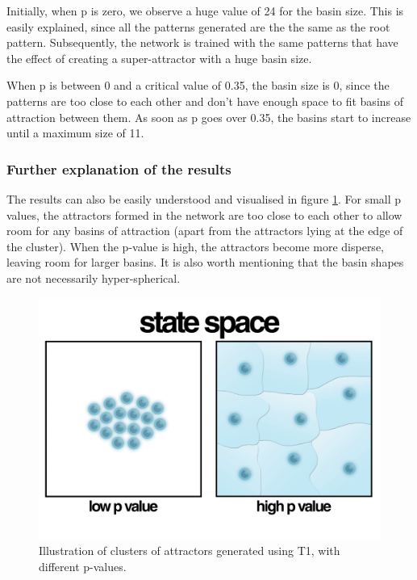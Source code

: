 Initially, when p is zero, we observe a huge value of 24 for the basin size. This is easily explained, since all the patterns generated are the the same as the root pattern. Subsequently, the network is trained with the same patterns that have the effect of creating a super-attractor with a huge basin size.

When p is between 0 and a critical value of 0.35, the basin size is 0, since the patterns are too close to each other and don't have enough space to fit basins of attraction between them. As soon as p goes over 0.35, the basins start to increase until a maximum size of 11.

\subsubsection{Further explanation of the results}

The results can also be easily understood and visualised in figure \ref{fig:basins}. For small p values, the attractors formed in the network are too close to each other to allow room for any basins of attraction (apart from the attractors lying at the edge of the cluster). When the p-value is high, the attractors become more disperse, leaving room for larger basins. It is also worth mentioning that the basin shapes are not necessarily hyper-spherical.  


\begin{figure}[h]
  \centering
\includegraphics[scale=0.25]{images/basins_of_attraction.png}
\caption{Illustration of clusters of attractors generated using T1, with different p-values. }
\label{fig:basins}
\end{figure}


